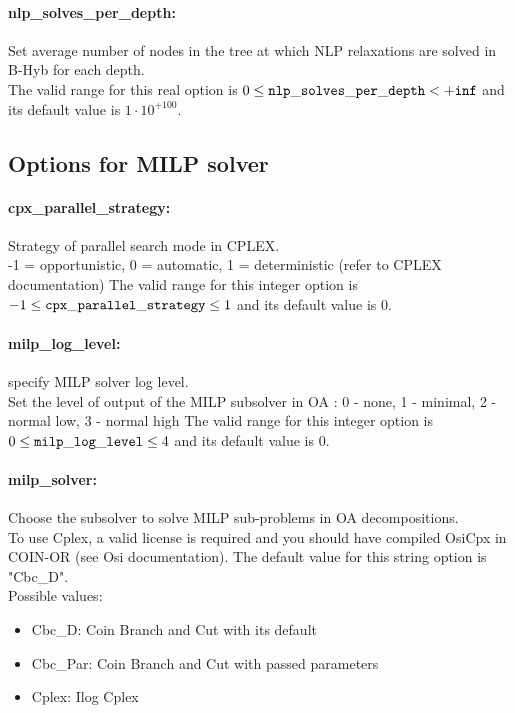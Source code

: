 \paragraph{nlp\_solves\_per\_depth:}\label{sec:nlp_solves_per_depth} Set average number of nodes in the tree at which NLP relaxations are solved in B-Hyb for each depth. $\;$ \\
 The valid range for this real option is 
$0 \le {\tt nlp\_solves\_per\_depth } <  {\tt +inf}$
and its default value is $1 \cdot 10^{+100}$.


\subsection{Options for MILP solver}
\label{sec:Options_for_MILP_solver}
\paragraph{cpx\_parallel\_strategy:}\label{sec:cpx_parallel_strategy} Strategy of parallel search mode in CPLEX. $\;$ \\
 -1 = opportunistic, 0 = automatic, 1 =
deterministic (refer to CPLEX documentation) The valid range for this integer option is
$-1 \le {\tt cpx\_parallel\_strategy } \le 1$
and its default value is $0$.


\paragraph{milp\_log\_level:}\label{sec:milp_log_level} specify MILP solver log level. $\;$ \\
 Set the level of output of the MILP subsolver in
OA : 0 - none, 1 - minimal, 2 - normal low, 3 -
normal high The valid range for this integer option is
$0 \le {\tt milp\_log\_level } \le 4$
and its default value is $0$.


\paragraph{milp\_solver:}\label{sec:milp_solver} Choose the subsolver to solve MILP sub-problems in OA decompositions. $\;$ \\
  To use Cplex, a valid license is required and
you should have compiled OsiCpx in COIN-OR  (see
Osi documentation).
The default value for this string option is "Cbc\_D".
\\ 
Possible values:
\begin{itemize}
   \item Cbc\_D: Coin Branch and Cut with its default
   \item Cbc\_Par: Coin Branch and Cut with passed parameters
   \item Cplex: Ilog Cplex
\end{itemize}


